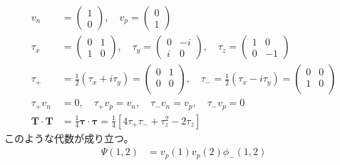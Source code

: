 \documentclass[uplatex,dvipdfmx,a4paper,11pt]{jlreq}
\numberwithin{equation}{section}
\theoremstyle{definition}
\begin{document}
\begin{align}
  v_n               & = \begin{pmatrix}
                          1 \\ 0
                        \end{pmatrix}, \quad
  v_p = \begin{pmatrix}
          0 \\ 1
        \end{pmatrix}                                                                                       \\
  \tau_x            & = \begin{pmatrix}
                          0 & 1 \\
                          1 & 0
                        \end{pmatrix}, \quad
  \tau_y = \begin{pmatrix}
             0 & -i \\
             i & 0
           \end{pmatrix}, \quad
  \tau_z = \begin{pmatrix}
             1 & 0  \\
             0 & -1
           \end{pmatrix}                                                                                    \\
  \tau_+            & = \frac{1}{2}(\tau_x + i\tau_y) = \begin{pmatrix}
                                                          0 & 1 \\
                                                          0 & 0 \\
                                                        \end{pmatrix}, \quad
  \tau_- = \frac{1}{2}(\tau_x - i\tau_y) = \begin{pmatrix}
                                             0 & 0 \\
                                             1 & 0 \\
                                           \end{pmatrix}                                                    \\
  \tau_+v_n         & = 0, \quad \tau_+v_p = v_n, \quad \tau_-v_n = v_p, \quad \tau_-v_p = 0                 \\
  \bm{T}\cdot\bm{T} & = \frac{1}{4}\bm{\tau}\cdot\bm{\tau} = \frac{1}{4}[4\tau_+\tau_- + \tau_z^2 - 2\tau_z]
\end{align}
このような代数が成り立つ。
\begin{align}
  \Psi(1, 2) & = v_p(1)v_p(2)\phi_-(1,2)
\end{align}
\end{document}

